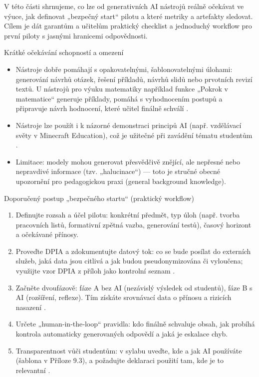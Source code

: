\documentclass{report}%
\begin{document}
%

V této části shrnujeme, co lze od generativních AI nástrojů reálně očekávat ve výuce, jak definovat „bezpečný start“ pilotu a které metriky a artefakty sledovat. Cílem je dát garantům a učitelům praktický checklist a jednoduchý workflow pro první piloty s jasnými hranicemi odpovědnosti.

Krátké očekávání schopností a omezení
\begin{itemize}
  \item Nástroje dobře pomáhají s opakovatelnými, šablonovatelnými úlohami: generování návrhů otázek, řešení příkladů, návrhů slidů nebo prvotních revizí textů. U nástrojů pro výuku matematiky například funkce „Pokrok v matematice“ generuje příklady, pomáhá s vyhodnocením postupů a připravuje návrh hodnocení, které učitel finálně schválí \cite{kb_ai_101_tipu_pdf_04e4a115_page_8_1}.
  \item Nástroje lze použít i k názorné demonstraci principů AI (např. vzdělávací světy v Minecraft Education), což je užitečné při zavádění tématu studentům \cite{kb_ai_101_tipu_pdf_04e4a115_page_15_2}.
  \item Limitace: modely mohou generovat přesvědčivě znějící, ale nepřesné nebo nepravdivé informace (tzv. „halucinace“) — toto je stručné obecné upozornění pro pedagogickou praxi (general background knowledge).
\end{itemize}

Doporučený postup „bezpečného startu“ (praktický workflow)
\begin{enumerate}
  \item Definujte rozsah a účel pilotu: konkrétní předmět, typ úloh (např. tvorba pracovních listů, formativní zpětná vazba, generování testů), časový horizont a očekávané přínosy.
  \item Proveďte DPIA a zdokumentujte datový tok: co se bude posílat do externích služeb, jaká data jsou citlivá a jak budou pseudonymizována či vyloučena; využijte vzor DPIA z příloh jako kontrolní seznam \cite{kb_malinka_chatgpt_ve_vyuce_dva_roky_pote_2024_pdf_90bc3aaf_page_12_1}.
  \item Začněte dvoufázově: fáze A bez AI (nezávislý výsledek od studentů), fáze B s AI (rozšíření, reflexe). Tím získáte srovnávací data o přínosu a rizicích nasazení \cite{kb_malinka_chatgpt_ve_vyuce_dva_roky_pote_2024_pdf_90bc3aaf_page_12_1}.
  \item Určete „human‑in‑the‑loop“ pravidla: kdo finálně schvaluje obsah, jak probíhá kontrola automaticky generovaných odpovědí a jaká je eskalace chyb.
  \item Transparentnost vůči studentům: v sylabu uveďte, kde a jak AI používáte (šablona v Příloze 9.3), a požadujte deklaraci použití tam, kde je to relevantní \cite{kb_malinka_chatgpt_ve_vyuce_dva_roky_pote_2024_pdf_90bc3aaf_page_12_1}.
\end{enumerate}
\end{document}
